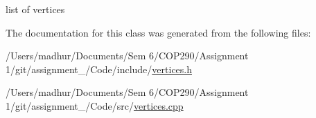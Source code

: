 list of vertices 



The documentation for this class was generated from the following files\+:\begin{DoxyCompactItemize}
\item 
/\+Users/madhur/\+Documents/\+Sem 6/\+C\+O\+P290/\+Assignment 1/git/assignment\+\_/\+Code/include/\mbox{\hyperlink{vertices_8h}{vertices.\+h}}\item 
/\+Users/madhur/\+Documents/\+Sem 6/\+C\+O\+P290/\+Assignment 1/git/assignment\+\_/\+Code/src/\mbox{\hyperlink{vertices_8cpp}{vertices.\+cpp}}\end{DoxyCompactItemize}
